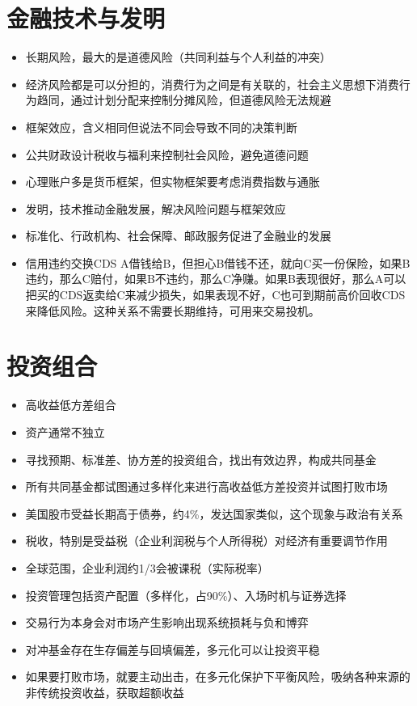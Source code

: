 \documentclass[
]{book}
\providecommand{\tightlist}{%
  \setlength{\itemsep}{0pt}\setlength{\parskip}{0pt}}
\begin{document}
\hypertarget{ux91d1ux878dux6280ux672fux4e0eux53d1ux660e}{%
\section{金融技术与发明}\label{ux91d1ux878dux6280ux672fux4e0eux53d1ux660e}}

\begin{itemize}
\tightlist
\item
  长期风险，最大的是道德风险（共同利益与个人利益的冲突）
\item
  经济风险都是可以分担的，消费行为之间是有关联的，社会主义思想下消费行为趋同，通过计划分配来控制分摊风险，但道德风险无法规避
\item
  框架效应，含义相同但说法不同会导致不同的决策判断
\item
  公共财政设计税收与福利来控制社会风险，避免道德问题
\item
  心理账户多是货币框架，但实物框架要考虑消费指数与通胀
\item
  发明，技术推动金融发展，解决风险问题与框架效应
\item
  标准化、行政机构、社会保障、邮政服务促进了金融业的发展
\item
  信用违约交换CDS A借钱给B，但担心B借钱不还，就向C买一份保险，如果B违约，那么C赔付，如果B不违约，那么C净赚。如果B表现很好，那么A可以把买的CDS返卖给C来减少损失，如果表现不好，C也可到期前高价回收CDS来降低风险。这种关系不需要长期维持，可用来交易投机。
\end{itemize}

\hypertarget{ux6295ux8d44ux7ec4ux5408}{%
\section{投资组合}\label{ux6295ux8d44ux7ec4ux5408}}

\begin{itemize}
\tightlist
\item
  高收益低方差组合
\item
  资产通常不独立
\item
  寻找预期、标准差、协方差的投资组合，找出有效边界，构成共同基金
\item
  所有共同基金都试图通过多样化来进行高收益低方差投资并试图打败市场
\item
  美国股市受益长期高于债券，约4\%，发达国家类似，这个现象与政治有关系
\item
  税收，特别是受益税（企业利润税与个人所得税）对经济有重要调节作用
\item
  全球范围，企业利润约1/3会被课税（实际税率）
\item
  投资管理包括资产配置（多样化，占90\%）、入场时机与证券选择
\item
  交易行为本身会对市场产生影响出现系统损耗与负和博弈
\item
  对冲基金存在生存偏差与回填偏差，多元化可以让投资平稳
\item
  如果要打败市场，就要主动出击，在多元化保护下平衡风险，吸纳各种来源的非传统投资收益，获取超额收益
\end{itemize}
\end{document}
